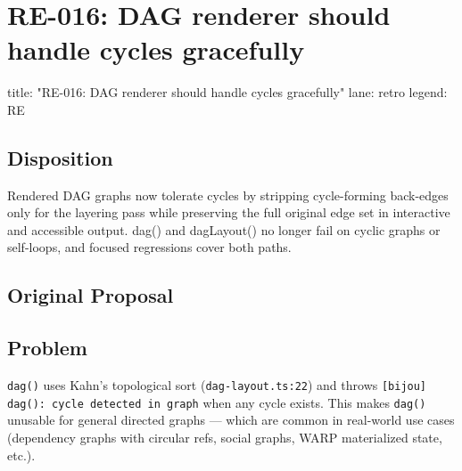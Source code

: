 \chapter{RE-016: DAG renderer should handle cycles gracefully}\label{record-401}

\smallskip

\begin{RecordMeta}
title: "RE-016: DAG renderer should handle cycles gracefully"
lane: retro
legend: RE

\end{RecordMeta}

\section{Disposition}\label{record-401-disposition}

Rendered DAG graphs now tolerate cycles by stripping cycle-forming back-edges only for the layering pass while preserving the full original edge set in interactive and accessible output. dag() and dagLayout() no longer fail on cyclic graphs or self-loops, and focused regressions cover both paths.

\section{Original Proposal}\label{record-401-original-proposal}

\section{Problem}\label{record-401-problem}

\texttt{d\allowbreak{}a\allowbreak{}g\allowbreak{}(\allowbreak{})} uses Kahn's topological sort (\texttt{d\allowbreak{}a\allowbreak{}g\allowbreak{}-\allowbreak{}l\allowbreak{}a\allowbreak{}y\allowbreak{}o\allowbreak{}u\allowbreak{}t\allowbreak{}.\allowbreak{}t\allowbreak{}s\allowbreak{}:\allowbreak{}2\allowbreak{}2}) and throws \texttt{[\allowbreak{}b\allowbreak{}i\allowbreak{}j\allowbreak{}o\allowbreak{}u\allowbreak{}]\allowbreak{} \allowbreak{}d\allowbreak{}a\allowbreak{}g\allowbreak{}(\allowbreak{})\allowbreak{}:\allowbreak{} \allowbreak{}c\allowbreak{}y\allowbreak{}c\allowbreak{}l\allowbreak{}e\allowbreak{} \allowbreak{}d\allowbreak{}e\allowbreak{}t\allowbreak{}e\allowbreak{}c\allowbreak{}t\allowbreak{}e\allowbreak{}d\allowbreak{} \allowbreak{}i\allowbreak{}n\allowbreak{} \allowbreak{}g\allowbreak{}r\allowbreak{}a\allowbreak{}p\allowbreak{}h} when any cycle exists. This makes \texttt{d\allowbreak{}a\allowbreak{}g\allowbreak{}(\allowbreak{})} unusable for general directed graphs --- which are common in real-world use cases (dependency graphs with circular refs, social graphs, WARP materialized state, etc.).

